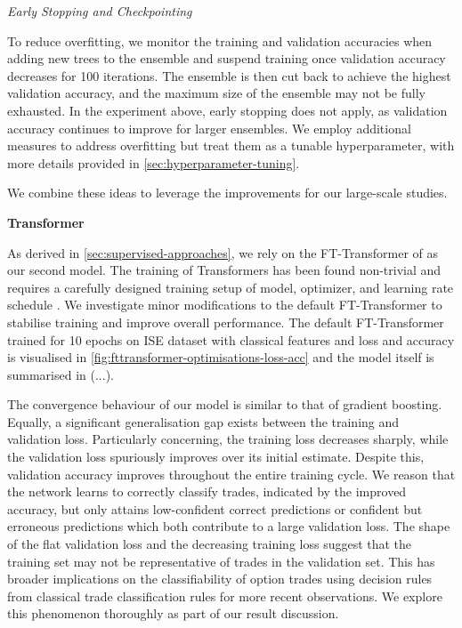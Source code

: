 \emph{Early Stopping and Checkpointing}

To reduce overfitting, we monitor the training and validation accuracies when adding new trees to the ensemble and suspend training once validation accuracy decreases for 100 iterations. The ensemble is then cut back to achieve the highest validation accuracy, and the maximum size of the ensemble may not be fully exhausted. In the experiment above, early stopping does not apply, as validation accuracy continues to improve for larger ensembles. We employ additional measures to address overfitting but treat them as a tunable hyperparameter, with more details provided in \cref{sec:hyperparameter-tuning}.

We combine these ideas to leverage the improvements for our large-scale studies.

\textbf{Transformer}

As derived in \cref{sec:supervised-approaches}, we rely on the FT-Transformer of \textcite[][4--5]{gorishniyRevisitingDeepLearning2021} as our second model. The training of Transformers has been found non-trivial and requires a carefully designed training setup of model, optimizer, and learning rate schedule \autocite[][1]{liuUnderstandingDifficultyTraining2020}. We investigate minor modifications to the default FT-Transformer to stabilise training and improve overall performance. The default FT-Transformer trained for 10 epochs on \gls{ISE} dataset with classical features and loss and accuracy is visualised in \cref{fig:fttransformer-optimisations-loss-acc} and the model itself is summarised in (...).

The convergence behaviour of our model is similar to that of gradient boosting. Equally, a significant generalisation gap exists between the training and validation loss. Particularly concerning, the training loss decreases sharply, while the validation loss spuriously improves over its initial estimate. Despite this, validation accuracy improves throughout the entire training cycle. We reason that the network learns to correctly classify trades, indicated by the improved accuracy, but only attains low-confident correct predictions or confident but erroneous predictions which both contribute to a large validation loss. The shape of the flat validation loss and the decreasing training loss suggest that the training set may not be representative of trades in the validation set. This has broader implications on the classifiability of option trades using decision rules from classical trade classification rules for more recent observations. We explore this phenomenon thoroughly as part of our result discussion.

